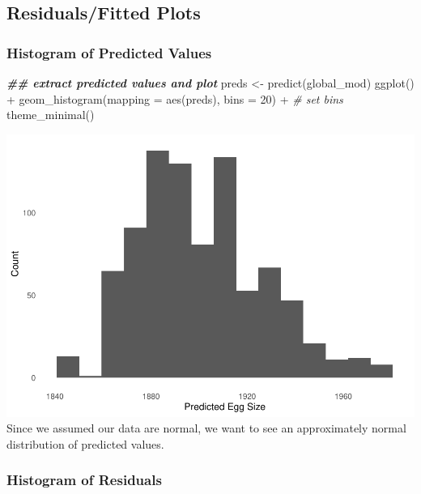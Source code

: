 \documentclass[
]{article}
\newenvironment{Shaded}{\begin{snugshade}}{\end{snugshade}}
\newcommand{\AttributeTok}[1]{\textcolor[rgb]{0.77,0.63,0.00}{#1}}
\newcommand{\CommentTok}[1]{\textcolor[rgb]{0.56,0.35,0.01}{\textit{#1}}}
\newcommand{\DecValTok}[1]{\textcolor[rgb]{0.00,0.00,0.81}{#1}}
\newcommand{\DocumentationTok}[1]{\textcolor[rgb]{0.56,0.35,0.01}{\textbf{\textit{#1}}}}
\newcommand{\FunctionTok}[1]{\textcolor[rgb]{0.00,0.00,0.00}{#1}}
\newcommand{\NormalTok}[1]{#1}
\newcommand{\OtherTok}[1]{\textcolor[rgb]{0.56,0.35,0.01}{#1}}
\newcommand{\SpecialCharTok}[1]{\textcolor[rgb]{0.00,0.00,0.00}{#1}}
\begin{document}
\hypertarget{residualsfitted-plots}{%
\subsection{Residuals/Fitted Plots}\label{residualsfitted-plots}}

\hypertarget{histogram-of-predicted-values}{%
\subsubsection{Histogram of Predicted
Values}\label{histogram-of-predicted-values}}

\begin{Shaded}
\begin{Highlighting}[]
\DocumentationTok{\#\# extract predicted values and plot}
\NormalTok{preds }\OtherTok{\textless{}{-}} \FunctionTok{predict}\NormalTok{(global\_mod)}
\FunctionTok{ggplot}\NormalTok{() }\SpecialCharTok{+} 
  \FunctionTok{geom\_histogram}\NormalTok{(}\AttributeTok{mapping =} \FunctionTok{aes}\NormalTok{(preds), }\AttributeTok{bins =} \DecValTok{20}\NormalTok{) }\SpecialCharTok{+} \CommentTok{\# set bins }
  \FunctionTok{theme\_minimal}\NormalTok{()}
\end{Highlighting}
\end{Shaded}

\includegraphics{SCMU_egg_model_files/figure-latex/d1-1.pdf} Since we
assumed our data are normal, we want to see an approximately normal
distribution of predicted values.

\hypertarget{histogram-of-residuals}{%
\subsubsection{Histogram of Residuals}\label{histogram-of-residuals}}
\end{document}
